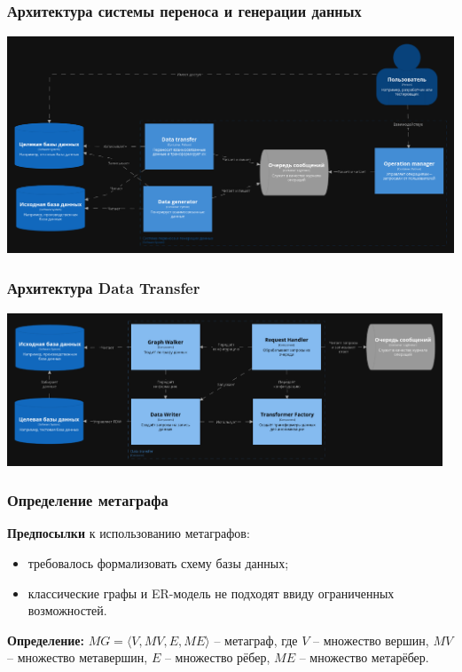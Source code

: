 \documentclass[pdf, hyperref={unicode}, aspectratio=169]{beamer}
\begin{document}
\begin{frame}
\frametitle{Архитектура системы переноса и генерации данных}
	\begin{center}
		\includegraphics[height = 6.5cm]{img/structurizr-Containers-cut}
	\end{center}
\end{frame}


\begin{frame}
\frametitle{Архитектура Data Transfer}
	\begin{center}
		\includegraphics[width = 13cm]{img/structurizr-DataTransferComponents-cut}
	\end{center}
\end{frame}


\begin{frame}
\frametitle{Определение метаграфа}
	\textbf{Предпосылки} к использованию метаграфов:

	\begin{itemize}
		\item требовалось формализовать схему базы данных;
		\item классические графы и ER-модель не подходят ввиду ограниченных возможностей.
	\end{itemize}

	\textbf{Определение:} $MG = \langle V, MV, E, ME \rangle$ -- метаграф, где $V$ -- множество вершин, $MV$ -- множество метавершин, $E$ -- множество рёбер, $ME$ -- множество метарёбер.
\end{frame}
\end{document}
